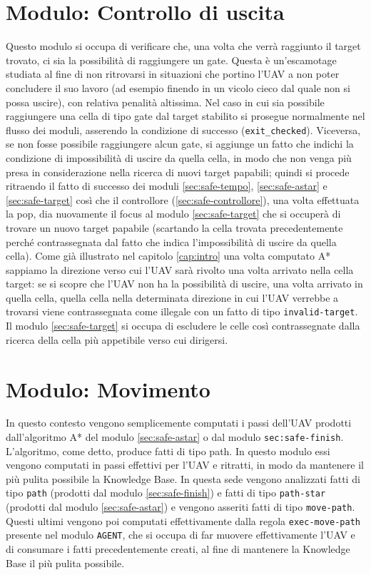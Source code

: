 \section{Modulo: Controllo di uscita} \label{sec:safe-uscita}
Questo modulo si occupa di verificare che, una volta che verrà raggiunto il target trovato, ci sia la possibilità di raggiungere un gate. Questa è un'escamotage studiata al fine di non ritrovarsi in situazioni che portino l'UAV a non poter concludere il suo lavoro (ad esempio finendo in un vicolo cieco dal quale non si possa uscire), con relativa penalità altissima.
Nel caso in cui sia possibile raggiungere una cella di tipo gate dal target stabilito si prosegue normalmente nel flusso dei moduli, asserendo la condizione di successo (\texttt{exit\_checked}). Viceversa, se non fosse possibile raggiungere alcun gate, si aggiunge un fatto che indichi la condizione di impossibilità di uscire da quella cella, in modo che non venga più presa in considerazione nella ricerca di nuovi target papabili; quindi si procede ritraendo il fatto di successo dei moduli \ref{sec:safe-tempo}, \ref{sec:safe-astar} e \ref{sec:safe-target} così che il controllore (\ref{sec:safe-controllore}), una volta effettuata la pop, dia nuovamente il focus al modulo \ref{sec:safe-target} che si occuperà di trovare un nuovo target papabile (scartando la cella trovata precedentemente perché contrassegnata dal fatto che indica l'impossibilità di uscire da quella cella). Come già illustrato nel capitolo \ref{cap:intro} una volta computato A* sappiamo la direzione verso cui l'UAV sarà rivolto una volta arrivato nella cella target: se si scopre che l'UAV non ha la possibilità di uscire, una volta arrivato in quella cella, quella cella nella determinata direzione in cui l'UAV verrebbe a trovarsi viene contrassegnata come illegale con un fatto di tipo \texttt{invalid-target}. Il modulo \ref{sec:safe-target} si occupa di escludere le celle così contrassegnate dalla ricerca della cella più appetibile verso cui dirigersi.

\section{Modulo: Movimento} \label{sec:safe-movimento}
In questo contesto vengono semplicemente computati i passi dell'UAV prodotti dall'algoritmo A* del modulo \ref{sec:safe-astar} o dal modulo \texttt{sec:safe-finish}. L'algoritmo, come detto, produce fatti di tipo path. In questo modulo essi vengono computati in passi effettivi per l'UAV e ritratti, in modo da mantenere il più pulita possibile la Knowledge Base.
In questa sede vengono analizzati fatti di tipo \texttt{path} (prodotti dal modulo \ref{sec:safe-finish}) e fatti di tipo \texttt{path-star} (prodotti dal modulo \ref{sec:safe-astar}) e vengono asseriti fatti di tipo \texttt{move-path}. Questi ultimi vengono poi computati effettivamente dalla regola \texttt{exec-move-path} presente nel modulo \texttt{AGENT}, che si occupa di far muovere effettivamente l'UAV e di consumare i fatti precedentemente creati, al fine di mantenere la Knowledge Base il più pulita possibile.

